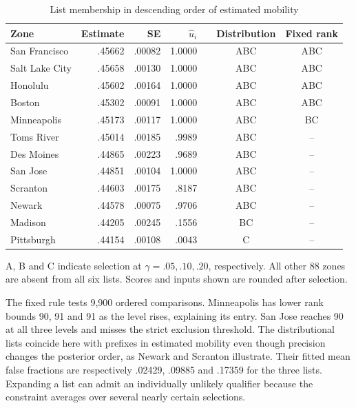 \documentclass[11pt]{article}
\begin{document}
\begin{table}[ht]
\centering
\caption{List membership in descending order of estimated mobility}
\small
\begin{tabular}{lrrrrcc}
\toprule
Zone & Estimate & SE & $\hat u_i$ & & Distribution & Fixed rank\\
\midrule
San Francisco & .45662 & .00082 & 1.0000 && ABC & ABC\\
Salt Lake City & .45658 & .00130 & 1.0000 && ABC & ABC\\
Honolulu & .45602 & .00164 & 1.0000 && ABC & ABC\\
Boston & .45302 & .00091 & 1.0000 && ABC & ABC\\
Minneapolis & .45173 & .00117 & 1.0000 && ABC & BC\\
Toms River & .45014 & .00185 & .9989 && ABC & --\\
Des Moines & .44865 & .00223 & .9689 && ABC & --\\
San Jose & .44851 & .00104 & 1.0000 && ABC & --\\
Scranton & .44603 & .00175 & .8187 && ABC & --\\
Newark & .44578 & .00075 & .9706 && ABC & --\\
Madison & .44205 & .00245 & .1556 && BC & --\\
Pittsburgh & .44154 & .00108 & .0043 && C & --\\
\bottomrule
\end{tabular}
\par\smallskip
\parbox{.92\linewidth}{A, B and C indicate selection at $\gamma=.05,.10,.20$, respectively. All other 88 zones are absent from all six lists. Scores and inputs shown are rounded after selection.}
\end{table}

The fixed rule tests 9,900 ordered comparisons. Minneapolis has lower rank bounds 90, 91 and 91 as the level rises, explaining its entry. San Jose reaches 90 at all three levels and misses the strict exclusion threshold. The distributional lists coincide here with prefixes in estimated mobility even though precision changes the posterior order, as Newark and Scranton illustrate. Their fitted mean false fractions are respectively .02429, .09885 and .17359 for the three lists. Expanding a list can admit an individually unlikely qualifier because the constraint averages over several nearly certain selections.
\end{document}
